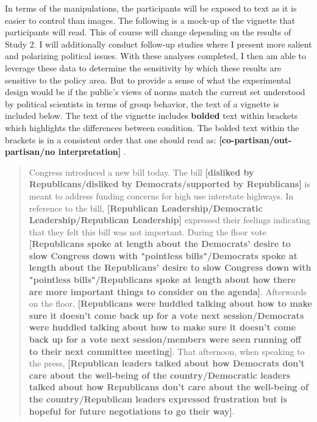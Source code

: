 \documentclass [12pt]{article}
\begin{document}
In terms of the manipulations, the participants will be exposed to text as it is easier to control than images. The following is a mock-up of the vignette that participants will read. This of course will change depending on the results of Study 2. I will additionally conduct follow-up studies where I present more salient and polarizing political issues. With these analyses completed, I then am able to leverage these data to determine the sensitivity by which these results are sensitive to the policy area. But to provide a sense of what the experimental design would be if the public's views of norms match the current set understood by political scientists in terms of group behavior, the text of a vignette is included below. The text of the vignette includes \textbf{bolded} text within brackets which highlights the differences between condition. The bolded text within the brackets is in a consistent order that one should read as: \textbf{[co-partisan/out-partisan/no interpretation]}
.
\begin{quote}
	Congress introduced a new bill today. The bill \textbf{[disliked by Republicans/disliked by Democrats/supported by Republicans]} is meant to address funding concerns for high use interstate highways. In reference to the bill, \textbf{[Republican Leadership/Democratic Leadership/Republican Leadership]} expressed their feelings indicating that they felt this bill was not important. During the floor vote \textbf{[Republicans spoke at length about the Democrats' desire to slow Congress down with "pointless bills"/Democrats spoke at length about the Republicans' desire to slow Congress down with "pointless bills"/Republicans spoke at length about how there are more important things to consider on the agenda]}. Afterwards on the floor, \textbf{[Republicans were huddled talking about how to make sure it doesn't come back up for a vote next session/Democrats were huddled talking about how to make sure it doesn't come back up for a vote next session/members were seen running off to their next committee meeting]}. That afternoon, when speaking to the press, \textbf{[Republican leaders talked about how Democrats don't care about the well-being of the country/Democratic leaders talked about how Republicans don't care about the well-being of the country/Republican leaders expressed frustration but is hopeful for future negotiations to go their way]}.
\end{quote}
\end{document}
